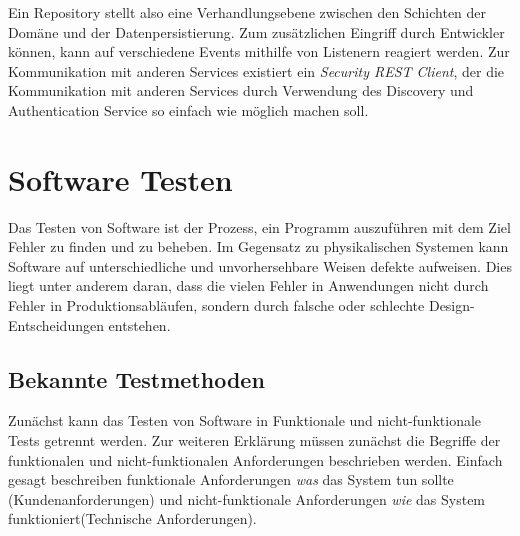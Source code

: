 \documentclass[12pt,a4paper,bibliography=totocnumbered,listof=totocnumbered]{scrartcl}
\begin{document}

Ein Repository stellt also eine Verhandlungsebene zwischen den Schichten der Domäne und der Datenpersistierung.
Zum zusätzlichen Eingriff durch Entwickler können, kann auf verschiedene Events mithilfe von Listenern reagiert werden. Zur Kommunikation mit anderen Services existiert ein \textit{Security REST Client}, der die Kommunikation mit anderen Services durch Verwendung des Discovery und Authentication Service so einfach wie möglich machen soll. 



\section{Software Testen}

Das Testen von Software ist der Prozess, ein Programm auszuführen mit dem Ziel Fehler zu finden und zu beheben. Im Gegensatz zu physikalischen Systemen kann Software auf unterschiedliche und unvorhersehbare Weisen defekte aufweisen. Dies liegt unter anderem daran, dass die vielen Fehler in Anwendungen nicht durch Fehler in Produktionsabläufen, sondern durch falsche oder schlechte Design-Entscheidungen entstehen.\cite{pantesting}

\subsection{Bekannte Testmethoden}\label{ch:soft-test}

Zunächst kann das Testen von Software in Funktionale und nicht-funktionale Tests getrennt werden. Zur weiteren Erklärung müssen zunächst die Begriffe der funktionalen und nicht-funktionalen Anforderungen beschrieben werden. Einfach gesagt beschreiben funktionale Anforderungen \textit{was} das System tun sollte (Kundenanforderungen) und nicht-funktionale Anforderungen \textit{wie} das System funktioniert(Technische Anforderungen).\cite{erikssonreq}

\end{document}
